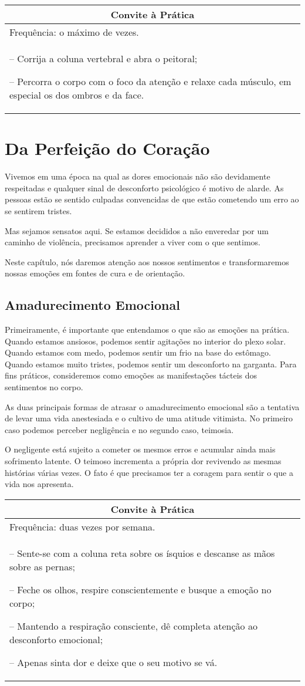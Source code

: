 \documentclass[oneside, 12pt]{book}
\newenvironment{prat}[1]
{\begin{center}
\begin{tabular}{p{0.9\textwidth}}
\hline\hline
\multicolumn{1}{c}{Convite à Prática}\\
\hline
Frequência: #1.\\
\hline
}{\\
\hline\hline
\end{tabular} 
\end{center}}
\begin{document}
\begin{prat}{o máximo de vezes}
-- Corrija a coluna vertebral e abra o peitoral;

-- Percorra o corpo com o foco da atenção e relaxe cada músculo, em especial os dos ombros e da face.
\end{prat}

\chapter*{Da Perfeição do Coração}

Vivemos em uma época na qual as dores emocionais não são devidamente respeitadas e qualquer sinal de desconforto psicológico é motivo de alarde. As pessoas estão se sentido culpadas convencidas de que estão cometendo um erro ao se sentirem tristes.

Mas sejamos sensatos aqui. Se estamos decididos a não enveredar por um caminho de violência, precisamos aprender a viver com o que sentimos.

Neste capítulo, nós daremos atenção aos nossos sentimentos e transformaremos nossas emoções em fontes de cura e de orientação.

\section*{Amadurecimento Emocional}

Primeiramente, é importante que entendamos o que são as emoções na prática. Quando estamos ansiosos, podemos sentir agitações no interior do plexo solar. Quando estamos com medo, podemos sentir um frio na base do estômago. Quando estamos muito tristes, podemos sentir um desconforto na garganta. Para fins práticos, consideremos como emoções as manifestações tácteis dos sentimentos no corpo.

As duas principais formas de atrasar o amadurecimento emocional são a tentativa de levar uma vida anestesiada e o cultivo de uma atitude vitimista. No primeiro caso podemos perceber negligência e no segundo caso, teimosia.

O negligente está sujeito a cometer os mesmos erros e acumular ainda mais sofrimento latente. O teimoso incrementa a própria dor revivendo as mesmas histórias várias vezes. O fato é que precisamos ter a coragem para sentir o que a vida nos apresenta.

\begin{prat}{duas vezes por semana}
-- Sente-se com a coluna reta sobre os ísquios e descanse as mãos sobre as pernas;

-- Feche os olhos, respire conscientemente e busque a emoção no corpo;

-- Mantendo a respiração consciente, dê completa atenção ao desconforto emocional;

-- Apenas sinta dor e deixe que o seu motivo se vá.
\end{prat}
\end{document}
